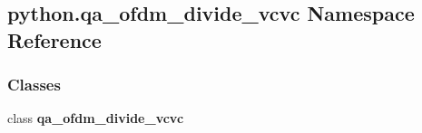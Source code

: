\subsection{python.\+qa\+\_\+ofdm\+\_\+divide\+\_\+vcvc Namespace Reference}
\label{namespacepython_1_1qa__ofdm__divide__vcvc}
\subsubsection*{Classes}
\begin{DoxyCompactItemize}
\item 
class {\bf qa\+\_\+ofdm\+\_\+divide\+\_\+vcvc}
\end{DoxyCompactItemize}
